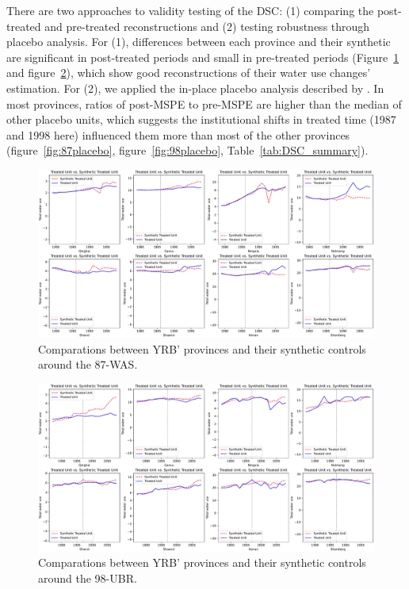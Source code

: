 \documentclass[default, sn-standardnature]{sn-jnl} %
\begin{document}
There are two approaches to validity testing of the DSC: (1) comparing the post-treated and pre-treated reconstructions and (2) testing robustness through placebo analysis.
For (1), differences between each province and their synthetic are significant in post-treated periods and small in pre-treated periods (Figure~\ref{fig:87panel} and figure~\ref{fig:98panel}), which show good reconstructions of their water use changes' estimation.
For (2), we applied the in-place placebo analysis described by \cite{abadie2010}. In most provinces, ratios of post-MSPE to pre-MSPE are higher than the median of other placebo units, which suggests the institutional shifts in treated time (1987 and 1998 here) influenced them more than most of the other provinces (figure~\ref{fig:87placebo}, figure~\ref{fig:98placebo}, Table~\ref{tab:DSC_summary}).

\begin{figure}
    \includegraphics[width=0.9\linewidth]{outputs/87panel.pdf}
    \centering
    \caption{Comparations between YRB' provinces and their synthetic controls around the 87-WAS.}
    \label{fig:87panel}
\end{figure}

\begin{figure}
    \includegraphics[width=0.9\linewidth]{outputs/98panel.pdf}
    \centering
    \caption{Comparations between YRB' provinces and their synthetic controls around the 98-UBR.}
    \label{fig:98panel}
\end{figure}
\end{document}
